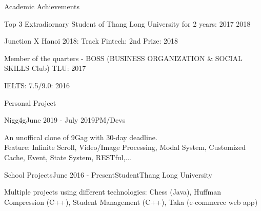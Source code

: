 \documentclass{resume} %
\begin{document}

\begin{rSection}{Academic Achievements} \itemsep -2pt
\item Top 3 Extradiornary Student of Thang Long University for 2 years: 2017 2018 
\item Junction X Hanoi 2018: Track Fintech: 2nd Prize: 2018
\item Member of the quarters - BOSS (BUSINESS ORGANIZATION \& SOCIAL SKILLS Club) TLU: 2017
\item IELTS: 7.5/9.0: 2016
\end{rSection}

\begin{rSection}{Personal Project}

\begin{rSubsection}{Nigg4g}{June 2019 - July 2019}{PM/Devs}
\item An unoffical clone of 9Gag with 30-day deadline.
\\Feature: Infinite Scroll, Video/Image Processing, Modal System, Customized Cache, Event, State System, RESTful,...
\end{rSubsection}

\begin{rSubsection}{School Projects}{June 2016 - Present}{Student}{Thang Long University}
\item Multiple projects using different technologies: Chess (Java), Huffman Compression (C++), Student Management (C++), Taka (e-commerce web app)
\end{rSubsection}
\end{rSection}
\end{document}
